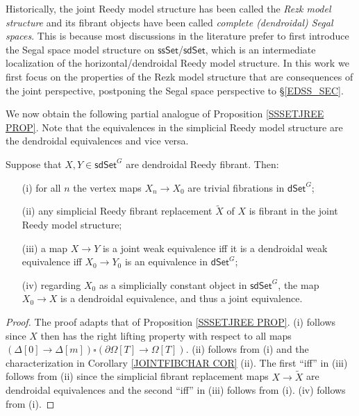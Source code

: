 \documentclass[a4paper,10pt
]{article}%
\begin{document}
\begin{remark}
Historically, the joint Reedy model structure has been called the \textit{Rezk model structure} and its fibrant objects have been called 
\textit{complete (dendroidal) Segal spaces}.
This is because most discussions in the literature 
\cite{Rez01,CM13a}
prefer to first introduce the Segal space model structure on
$\mathsf{ssSet}$/$\mathsf{sdSet}$, which is an intermediate localization of the 
horizontal/dendroidal Reedy model structure.
In this work we first focus on the properties of the Rezk model structure that are consequences of the joint perspective, 
postponing the Segal space perspective to \S \ref{EDSS_SEC}.
\end{remark}

We now obtain the following partial analogue of Proposition \ref{SSSETJREE PROP}. Note that the equivalences in the simplicial Reedy model structure are the dendroidal equivalences and vice versa.


\begin{corollary}\label{SDSETG COR}
	Suppose that $X, Y \in \mathsf{sdSet}^G$ are dendroidal Reedy fibrant. Then:
\begin{itemize}
	\item[(i)] for all $n$ the vertex maps $X_{n} \to X_{0}$ are trivial fibrations in $\mathsf{dSet}^G$;
	\item[(ii)] any simplicial Reedy fibrant replacement $\tilde{X}$ of $X$ is fibrant in the joint Reedy model structure;
	\item[(iii)] a map $X \to Y$ is a joint weak equivalence
	iff it is a dendroidal weak equivalence iff 
	$X_0 \to Y_0$ is an equivalence in $\mathsf{dSet}^G$;
	\item[(iv)] regarding $X_0$ as a simplicially constant object in $\mathsf{sdSet}^G$, the map $X_0 \to X$ is a dendroidal equivalence, and thus a joint equivalence. 
\end{itemize}
\end{corollary}

\begin{proof}
	The proof adapts that of Proposition \ref{SSSETJREE PROP}.
	(i) follows since $X$ then has the right lifting property with respect to all maps 
	$(\Delta[0] \to \Delta[m]) \square (\partial \Omega[T] \to \Omega[T])$. (ii) follows from (i) and the characterization in  Corollary \ref{JOINTFIBCHAR COR} (ii). The first ``iff'' in (iii) follows from (ii) since the simplicial fibrant replacement maps 
	$X \to \tilde{X}$ are dendroidal equivalences
	and the second ``iff'' in (iii) follows from (i).
	(iv) follows from (i).
\end{proof}
\end{document}
